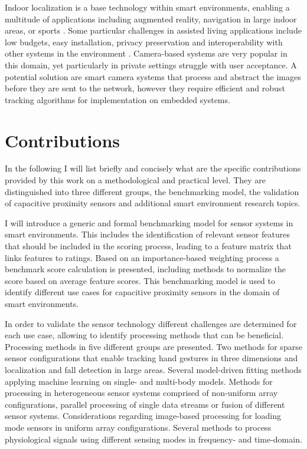 Indoor localization is a base technology within smart environments, enabling a multitude of applications including augmented reality, navigation in large indoor areas, or sports \cite{thomas2000arquake, ingram2004ultrawideband, leser2011local}. Some particular challenges in assisted living applications include low budgets, easy installation, privacy preservation and interoperability with other systems in the environment \cite{chessa_eval}. Camera-based systems are very popular in this domain, yet particularly in private settings struggle with user acceptance. A potential solution are smart camera systems that process and abstract the images before they are sent to the network, however they require efficient and robust tracking algorithms for implementation on embedded systems. 
 
\section{Contributions}
In the following I will list briefly and concisely what are the specific contributions provided by this work on a methodological and practical level. They are distinguished into three different groups, the benchmarking model, the validation of capacitive proximity sensors and additional smart environment research topics.

I will introduce a generic and formal benchmarking model for sensor systems in smart environments. This includes the identification of relevant sensor features that should be included in the scoring process, leading to a feature matrix that links features to ratings. Based on an importance-based weighting process a benchmark score calculation is presented, including methods to normalize the score based on average feature scores. This benchmarking model is used to identify different use cases for capacitive proximity sensors in the domain of smart environments.

In order to validate the sensor technology different challenges are determined for each use case, allowing to identify processing methods that can be beneficial. Processing methods in five different groups are presented. Two methods for sparse sensor configurations that enable tracking hand gestures in three dimensions and localization and fall detection in large areas. Several model-driven fitting methods applying machine learning on single- and multi-body models. Methods for processing in heterogeneous sensor systems comprised of non-uniform array configurations, parallel processing of single data streams or fusion of different sensor systems. Considerations regarding image-based processing for loading mode sensors in uniform array configurations. Several methods to process physiological signals using different sensing modes in frequency- and time-domain. 

